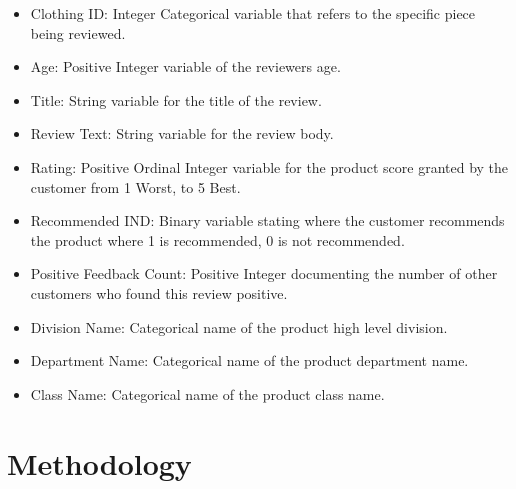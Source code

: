 \documentclass{article}
\begin{document}
\begin{itemize}
  \item Clothing ID: Integer Categorical variable that refers to the specific piece being reviewed.
  \item Age: Positive Integer variable of the reviewers age.\\
  \item Title: String variable for the title of the review.\\
  \item Review Text: String variable for the review body.\\
  \item Rating: Positive Ordinal Integer variable for the product score granted by the customer from 1 Worst, to 5 Best.\\
  \item Recommended IND: Binary variable stating where the customer recommends the product where 1 is recommended, 0 is not recommended.\\
  \item Positive Feedback Count: Positive Integer documenting the number of other customers who found this review positive.\\
  \item Division Name: Categorical name of the product high level division.\\
  \item Department Name: Categorical name of the product department name.\\
  \item Class Name: Categorical name of the product class name.\\
\end{itemize}

\section{Methodology}
\end{document}
